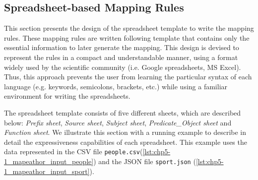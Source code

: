 \subsection{Spreadsheet-based Mapping Rules}
\label{sec:chp5_spreadsheet_design}


This section presents the design of the spreadsheet template to write the mapping rules. 
These mapping rules are written following template that contains only the essential information to later generate the mapping. 
This design is devised to represent the rules in a compact and understandable manner, using a format widely used by the scientific community (i.e. Google spreadsheets, MS Excel).
Thus, this approach prevents the user from learning the particular syntax of each language (e.g. keywords, semicolons, brackets, etc.) while using a familiar environment for writing the spreadsheets. 

The spreadsheet template consists of five different sheets, which are described below: \textit{Prefix sheet}, \textit{Source sheet}, \textit{Subject sheet}, \textit{Predicate\_Object sheet} and \textit{Function sheet}. We illustrate this section with a running example to describe in detail the expressiveness capabilities of each spreadsheet. This example uses the data represented in the CSV file \texttt{people.csv}(\cref{lst:chp5-1_mapeathor_input_people}) and the JSON file \texttt{sport.json} (\cref{lst:chp5-1_mapeathor_input_sport}).

